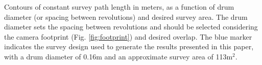 \label{fig:survey_length} Contours of constant survey path length in meters, as a function of drum diameter (or spacing between revolutions) and desired survey area. The drum diameter sets the spacing between revolutions and should be selected considering the camera footprint (Fig. \ref{fig:footprint}) and desired overlap. The blue marker indicates the survey design used to generate the results presented in this paper, with a drum diameter of 0.16m and an approximate survey area of 113m$^2$.